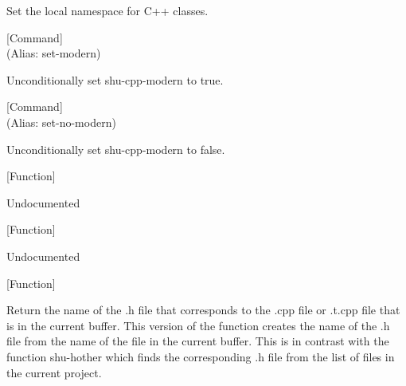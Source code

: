 \begin{doc-string}
Set the local namespace for C++ classes.
\end{doc-string}

\vspace{1em}
\noindent
{}
\usebox{\funcname}
 \hfill [Command]\\%
 (Alias: set-modern)

\begin{doc-string}
Unconditionally set shu-cpp-modern to true.
\end{doc-string}

\vspace{1em}
\noindent
{}
\usebox{\funcname}
 \hfill [Command]\\%
 (Alias: set-no-modern)

\begin{doc-string}
Unconditionally set shu-cpp-modern to false.
\end{doc-string}

\vspace{1em}
\noindent
{}
\usebox{\funcname}
 \hfill [Function]

\begin{doc-string}
Undocumented
\end{doc-string}

\vspace{1em}
\noindent
{}
\usebox{\funcname}
 \hfill [Function]

\begin{doc-string}
Undocumented
\end{doc-string}

\vspace{1em}
\noindent
{}
\usebox{\funcname}
 \hfill [Function]

\begin{doc-string}
Return the name of the .h file that corresponds to the .cpp file or .t.cpp file
that is in the current buffer.  This version of the function creates the name of
the .h file from the name of the file in the current buffer.  This is in contrast
with the function shu-hother which finds the corresponding .h file from the list
of files in the current project.
\end{doc-string}

